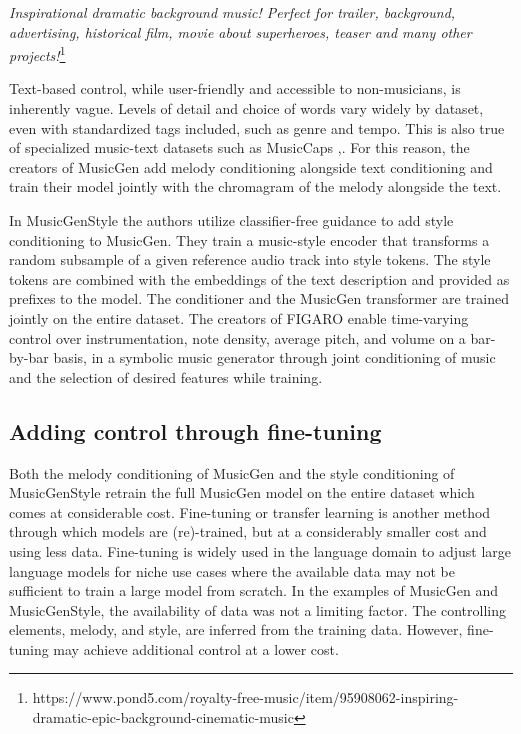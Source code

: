 \textit{Inspirational dramatic background music! Perfect for trailer, background, advertising, historical film, movie about superheroes, teaser and many other projects!}\footnote{ https://www.pond5.com/royalty-free-music/item/95908062-inspiring-dramatic-epic-background-cinematic-music
}

Text-based control, while user-friendly and accessible to non-musicians, is inherently vague. Levels of detail and choice of words vary widely by dataset, even with standardized tags included, such as genre and tempo. This is also true of specialized music-text datasets such as MusicCaps \cite{Agostinelli_Denk_Borsos_Engel_Verzetti_Caillon_Huang_Jansen_Roberts_Tagliasacchi_et_al._2023},\cite{Lee_Doh_Jeong_2023_subjectivity_musiccaps}. For this reason, the creators of MusicGen \cite{copet2023simple} add melody conditioning alongside text conditioning and train their model jointly with the chromagram of the melody alongside the text. 

In MusicGenStyle \cite{Rouard_Adi_Copet_Roebel_Défossez_musicgenstyle_2024} the authors utilize classifier-free guidance to add style conditioning to MusicGen. They train a music-style encoder that transforms a random subsample of a given reference audio track into style tokens. The style tokens are combined with the embeddings of the text description and provided as prefixes to the model. The conditioner and the MusicGen transformer are trained jointly on the entire dataset. 
The creators of FIGARO\cite{Rütte_figaro_2023} enable time-varying control over instrumentation, note density, average pitch, and volume on a bar-by-bar basis, in a symbolic music generator through joint conditioning  of music and the selection of desired features while training. 
\subsection{Adding control through fine-tuning}

Both the melody conditioning of MusicGen \cite{copet2023simple} and the style conditioning of MusicGenStyle \cite{Rouard_Adi_Copet_Roebel_Défossez_musicgenstyle_2024} retrain the full MusicGen model on the entire dataset which comes at considerable cost. Fine-tuning or transfer learning is another method through which models are (re)-trained, but at a considerably smaller cost and using less data. Fine-tuning is widely used in the language domain to adjust large language models for niche use cases where the available data may not be sufficient to train a large model from scratch. In the examples of MusicGen and MusicGenStyle, the availability of data was not a limiting factor. The controlling elements, melody, and style, are inferred from the training data. However, fine-tuning may achieve additional control at a lower cost. 

